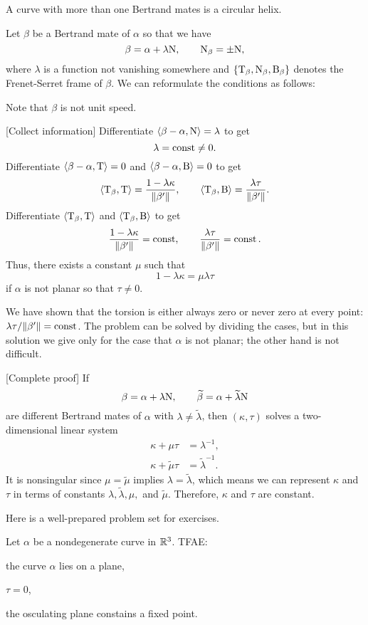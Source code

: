 \documentclass{../../large}
\def\a{\alpha}
\begin{document}
\begin{prb}
A curve with more than one Bertrand mates is a circular helix.
\end{prb}
\begin{sol}
Let $\beta$ be a Bertrand mate of $\a$ so that we have
\[\beta=\a+\lambda\rN,\qquad\rN_\beta=\pm\rN,\]
where $\lambda$ is a function not vanishing somewhere and $\{\mathrm{T}_\beta,\mathrm{N}_\beta,\mathrm{B}_\beta\}$ denotes the Frenet-Serret frame of $\beta$.
We can reformulate the conditions as follows:

Note that $\beta$ is not unit speed.

[Collect information]
Differentiate $\<\beta-\a,\rN\>=\lambda$ to get
\[\lambda=\operatorname{const}\ne0.\]
Differentiate $\<\beta-\a,\rT\>=0$ and $\<\beta-\a,\rB\>=0$ to get
\[\langle\mathrm{T}_\beta,\mathrm{T}\rangle=\frac{1-\lambda\kappa}{\|\beta'\|},\qquad\langle\mathrm{T}_\beta,\mathrm{B}\rangle=\frac{\lambda\tau}{\|\beta'\|}.\]
Differentiate $\langle\mathrm{T}_\beta,\mathrm{T}\rangle$ and $\langle\mathrm{T}_\beta,\mathrm{B}\rangle$ to get
\[\frac{1-\lambda\kappa}{\|\beta'\|}=\operatorname{const},\qquad\frac{\lambda\tau}{\|\beta'\|}=\operatorname{const}.\]
Thus, there exists a constant $\mu$ such that
\[1-\lambda\kappa=\mu\lambda\tau\]
if $\a$ is not planar so that $\tau\ne0$.

We have shown that the torsion is either always zero or never zero at every point: $\lambda\tau/\|\beta'\|=\operatorname{const}$.
The problem can be solved by dividing the cases, but in this solution we give only for the case that $\a$ is not planar; the other hand is not difficult.

[Complete proof]
If
\[\beta=\a+\lambda\rN,\qquad\tilde\beta=\a+\tilde\lambda\rN\]
are different Bertrand mates of $\a$ with $\lambda\ne\tilde\lambda$, then $(\kappa,\tau)$ solves a two-dimensional linear system
\begin{align*}
\kappa+\mu\tau&=\lambda^{-1},\\
\kappa+\tilde\mu\tau&=\tilde\lambda^{-1}.
\end{align*}
It is nonsingular since $\mu=\tilde\mu$ implies $\lambda=\tilde\lambda$, which means we can represent $\kappa$ and $\tau$ in terms of constants $\lambda,\tilde\lambda,\mu,$ and $\tilde\mu$.
Therefore, $\kappa$ and $\tau$ are constant.
\end{sol}

Here is a well-prepared problem set for exercises.

\begin{prb}
Let $\a$ be a nondegenerate curve in $\mathbb{R}^3$.
TFAE:
\begin{parts}
\item the curve $\a$ lies on a plane,
\item $\tau=0$,
\item the osculating plane constains a fixed point.
\end{parts}
\end{prb}
\end{document}
